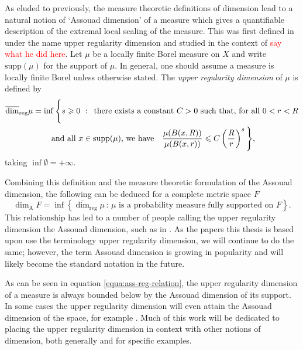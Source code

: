 As eluded to previously, the measure theoretic definitions of dimension lead to a natural notion of `Assouad dimension' of a measure which gives a quantifiable description of the extremal local scaling of the measure. This was first defined in \cite{anti1,anti2} under the name upper regularity dimension and studied in the context of \textcolor{red}{say what he did here}. Let $\mu$ be a locally finite Borel measure on $X$ and write $\text{supp}(\mu)$ for the support of $\mu$. In general, one should assume a measure is locally finite Borel unless otherwise stated. The \textit{upper regularity dimension} of $\mu$ is defined by 
\begin{multline*} 
\urdim \mu = \inf \Bigg\{ s \geq 0 \, \,  : \,  \text{ there exists a  constant }C  > 0\text{  such that, for all  $0< r< R $} \\ \text{  and all $x \in \text{supp} (\mu)$, we have }  \ \  \frac{\mu(B(x,R))}{\mu(B(x,r))} \leq C\left(\frac{R}{r}\right)^{s} \Bigg\},
\end{multline*}
taking $\inf \emptyset = + \infty$. 

Combining this definition and the measure theoretic formulation of the Assouad dimension, the following can be deduced for a complete metric space $F$
\label{equa:ass-reg-relation}
\begin{equation}
    \dim_{\text{A}} F = \inf \left\{ \overline{\dim}_{\text{reg}} \mu \,  \colon \, \mu \text{ is a probability measure fully supported on } F\right\}.
\end{equation}
This relationship has led to a number of people calling the upper regularity dimension the Assouad dimension, such as in \cite{hare-troscheit, fraser-kaenmaki, etc}. As the papers this thesis is based upon use the terminology upper regularity dimension, we will continue to do the same; however, the term Assouad dimension is growing in popularity and will likely become the standard notation in the future.

As can be seen in equation \ref{equa:ass-reg-relation}, the upper regularity dimension of a measure is always bounded below by the Assouad dimension of its support. In some cases the upper regularity dimension will even attain the Assouad dimension of the space, for example \cite[Theorem 2.3]{fraser-howroyd}. Much of this work will be dedicated to placing the upper regularity dimension in context with other notions of dimension, both generally and for specific examples.

